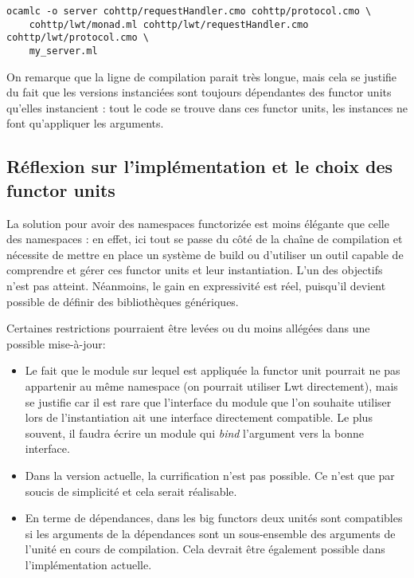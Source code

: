 \documentclass[11pt,a4paper]{report}
\begin{document}
\begin{verbatim}
ocamlc -o server cohttp/requestHandler.cmo cohttp/protocol.cmo \
    cohttp/lwt/monad.ml cohttp/lwt/requestHandler.cmo cohttp/lwt/protocol.cmo \
    my_server.ml 
\end{verbatim}

On remarque que la ligne de compilation parait très longue, mais cela se
justifie du fait que les versions instanciées sont toujours dépendantes des
functor units qu'elles instancient : tout le code se trouve dans ces functor
units, les instances ne font qu'appliquer les arguments.

\subsection{Réflexion sur l'implémentation et le choix des functor units}

La solution pour avoir des namespaces functorizée est moins élégante que celle
des namespaces : en effet, ici tout se passe du côté de la chaîne de compilation
et nécessite de mettre en place un système de build ou d'utiliser un outil
capable de comprendre et gérer ces functor units et leur instantiation. L'un des
objectifs n'est pas atteint. Néanmoins, le gain en expressivité est réel,
puisqu'il devient possible de définir des bibliothèques génériques.

Certaines restrictions pourraient être levées ou du moins allégées dans une
possible mise-à-jour:
\begin{itemize}
\item Le fait que le module sur lequel est appliquée la functor unit pourrait ne
  pas appartenir au même namespace (on pourrait utiliser Lwt directement), mais
  se justifie car il est rare que l'interface du module que l'on souhaite
  utiliser lors de l'instantiation ait une interface directement compatible. Le
  plus souvent, il faudra écrire un module qui \emph{bind} l'argument vers la
  bonne interface.
\item Dans la version actuelle, la currification n'est pas possible. Ce n'est
  que par soucis de simplicité et cela serait réalisable.
\item En terme de dépendances, dans les big functors deux unités sont
  compatibles si les arguments de la dépendances sont un sous-ensemble des
  arguments de l'unité en cours de compilation. Cela devrait être également
  possible dans l'implémentation actuelle.
\end{itemize}
\end{document}
